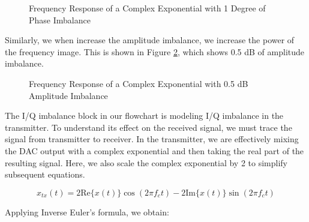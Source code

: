 \documentclass{article}
\begin{document}
\begin{figure}[H]
	\centerline{}
	\caption{Frequency Response of a Complex Exponential with 1 Degree of Phase Imbalance}
	\label{fig::iq_imbalance_0_mag_1_phase_freq}
\end{figure}

Similarly, we when increase the amplitude imbalance, we increase the power of the frequency image. This is shown in Figure \ref{fig::iq_imbalance_0p5_mag_0_phase_freq}, which shows 0.5 dB of amplitude imbalance.
 
\begin{figure}[H]
	\centerline{}
	\caption{Frequency Response of a Complex Exponential with 0.5 dB Amplitude Imbalance}
	\label{fig::iq_imbalance_0p5_mag_0_phase_freq}
\end{figure}

The I/Q imbalance block in our flowchart is modeling I/Q imbalance in the transmitter. To understand its effect on the received signal, we must trace the signal from transmitter to receiver. In the transmitter, we are effectively mixing the DAC output with a complex exponential and then taking the real part of the resulting signal. Here, we also scale the complex exponential by 2 to simplify subsequent equations.

\begin{equation}
	x_{tx}(t) = 2\text{Re}\{x(t)\}\cos(2{\pi}f_ct) - 2\text{Im}\{x(t)\}\sin(2{\pi}f_ct)
\end{equation}

Applying Inverse Euler's formula, we obtain:
\end{document}

